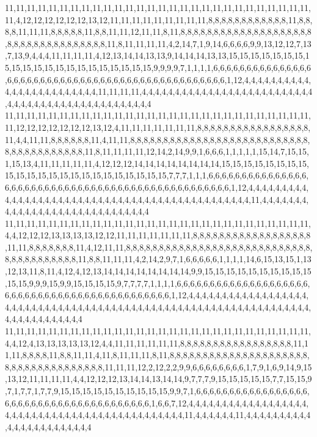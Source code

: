 11,11,11,11,11,11,11,11,11,11,11,11,11,11,11,11,11,11,11,11,11,11,11,11,11,11,11,11,11,4,12,12,12,12,12,12,13,12,11,11,11,11,11,11,11,11,11,8,8,8,8,8,8,8,8,8,8,8,8,11,8,8,8,8,11,11,11,8,8,8,8,8,11,8,8,11,11,12,11,11,8,11,8,8,8,8,8,8,8,8,8,8,8,8,8,8,8,8,8,8,8,8,8,8,8,8,8,8,8,8,8,8,8,8,8,8,8,11,8,11,11,11,11,4,2,14,7,1,9,14,6,6,6,6,9,9,13,12,12,7,13,7,13,9,4,4,4,11,11,11,11,4,12,13,14,14,13,13,9,14,14,14,13,13,15,15,15,15,15,15,15,15,15,15,15,15,15,15,15,15,15,15,15,15,15,9,9,9,9,7,1,1,1,1,6,6,6,6,6,6,6,6,6,6,6,6,6,6,6,6,6,6,6,6,6,6,6,6,6,6,6,6,6,6,6,6,6,6,6,6,6,6,6,6,6,6,6,6,6,6,6,6,1,12,4,4,4,4,4,4,4,4,4,4,4,4,4,4,4,4,4,4,4,4,4,4,4,4,11,11,11,11,4,4,4,4,4,4,4,4,4,4,4,4,4,4,4,4,4,4,4,4,4,4,4,4,4,4,4,4,4,4,4,4,4,4,4,4,4,4,4,4,4,4,4,4,4,4,4,4
11,11,11,11,11,11,11,11,11,11,11,11,11,11,11,11,11,11,11,11,11,11,11,11,11,11,11,11,11,12,12,12,12,12,12,12,13,12,4,11,11,11,11,11,11,11,8,8,8,8,8,8,8,8,8,8,8,8,8,8,8,8,8,11,4,4,11,11,8,8,8,8,8,8,11,4,11,11,8,8,8,8,8,8,8,8,8,8,8,8,8,8,8,8,8,8,8,8,8,8,8,8,8,8,8,8,8,8,8,8,8,8,8,8,8,8,8,11,8,11,11,11,11,12,14,2,14,9,9,1,6,6,6,1,1,1,1,1,15,14,7,15,15,1,15,13,4,11,11,11,11,11,4,12,12,12,14,14,14,14,14,14,14,14,15,15,15,15,15,15,15,15,15,15,15,15,15,15,15,15,15,15,15,15,15,15,15,7,7,7,1,1,1,6,6,6,6,6,6,6,6,6,6,6,6,6,6,6,6,6,6,6,6,6,6,6,6,6,6,6,6,6,6,6,6,6,6,6,6,6,6,6,6,6,6,6,6,6,6,6,6,6,1,12,4,4,4,4,4,4,4,4,4,4,4,4,4,4,4,4,4,4,4,4,4,4,4,4,4,4,4,4,4,4,4,4,4,4,4,4,4,4,4,4,4,4,4,4,4,4,11,4,4,4,4,4,4,4,4,4,4,4,4,4,4,4,4,4,4,4,4,4,4,4,4,4,4,4,4,4
11,11,11,11,11,11,11,11,11,11,11,11,11,11,11,11,11,11,11,11,11,11,11,11,11,11,11,11,4,4,12,12,12,13,13,13,13,12,12,11,11,11,11,11,11,11,8,8,8,8,8,8,8,8,8,8,8,8,8,8,8,8,8,8,11,11,8,8,8,8,8,8,8,11,4,12,11,11,8,8,8,8,8,8,8,8,8,8,8,8,8,8,8,8,8,8,8,8,8,8,8,8,8,8,8,8,8,8,8,8,8,8,8,8,8,8,8,11,8,8,11,11,11,4,2,14,2,9,7,1,6,6,6,6,6,1,1,1,1,14,6,15,13,15,1,13,12,13,11,8,11,4,12,4,12,13,14,14,14,14,14,14,14,14,9,9,15,15,15,15,15,15,15,15,15,15,15,15,9,9,9,15,9,9,15,15,15,15,9,7,7,7,7,1,1,1,1,6,6,6,6,6,6,6,6,6,6,6,6,6,6,6,6,6,6,6,6,6,6,6,6,6,6,6,6,6,6,6,6,6,6,6,6,6,6,6,6,6,6,6,6,6,1,12,4,4,4,4,4,4,4,4,4,4,4,4,4,4,4,4,4,4,4,4,4,4,4,4,4,4,4,4,4,4,4,4,4,4,4,4,4,4,4,4,4,4,4,4,4,4,4,4,4,4,4,4,4,4,4,4,4,4,4,4,4,4,4,4,4,4,4,4,4,4,4,4,4,4,4,4
11,11,11,11,11,11,11,11,11,11,11,11,11,11,11,11,11,11,11,11,11,11,11,11,11,11,11,11,4,4,12,4,13,13,13,13,13,12,4,4,11,11,11,11,11,11,8,8,8,8,8,8,8,8,8,8,8,8,8,8,8,8,8,11,11,11,8,8,8,8,11,8,8,11,11,4,11,8,11,11,11,8,11,8,8,8,8,8,8,8,8,8,8,8,8,8,8,8,8,8,8,8,8,8,8,8,8,8,8,8,8,8,8,8,8,8,8,8,8,11,11,11,12,2,12,2,2,9,9,6,6,6,6,6,6,6,6,1,7,9,1,6,9,14,9,15,13,12,11,11,11,11,4,4,12,12,12,13,14,14,13,14,14,9,7,7,7,9,15,15,15,15,15,7,7,15,15,9,7,1,7,7,1,7,7,9,15,15,15,15,15,15,15,15,15,15,9,9,7,1,6,6,6,6,6,6,6,6,6,6,6,6,6,6,6,6,6,6,6,6,6,6,6,6,6,6,6,6,6,6,6,6,6,6,6,6,6,6,6,1,6,6,7,12,4,4,4,4,4,4,4,4,4,4,4,4,4,4,4,4,4,4,4,4,4,4,4,4,4,4,4,4,4,4,4,4,4,4,4,4,4,4,4,4,4,4,4,4,4,11,4,4,4,4,4,4,11,4,4,4,4,4,4,4,4,4,4,4,4,4,4,4,4,4,4,4,4,4,4,4
